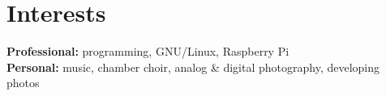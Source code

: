 \documentclass[]{friggeri-cv} %
\begin{document}

\section{Interests}

\textbf{Professional:} programming, GNU/Linux, Raspberry Pi
\\
\textbf{Personal:} music, chamber choir, analog \& digital photography, developing photos

\end{document}
